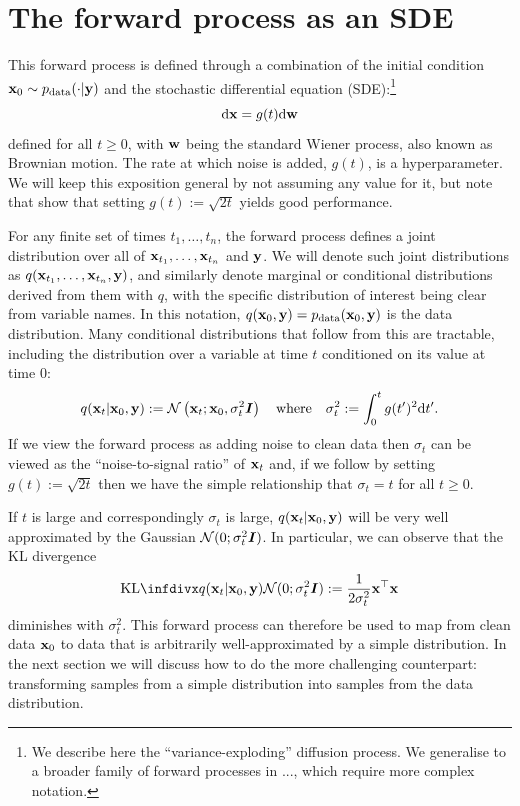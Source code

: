 \section{The forward process as an SDE} \label{sec:diffusion-forward-sde}
This forward process is defined through a combination of the initial condition ${\mathbf{x}}_0 \sim p_{\rm{data}}(\cdot|{\mathbf{y}})$ and the stochastic differential equation (SDE):\footnote{We describe here the ``variance-exploding'' diffusion process. We generalise to a broader family of forward processes in ..., which require more complex notation.}
\begin{equation} \label{eq:forward-diffusion}
    \mathrm{d}{\mathbf{x}} = g(t) \mathrm{d}{\mathbf{w}}
\end{equation}
defined for all $t \geq 0$, with ${\mathbf{w}}$ being the standard Wiener process, also known as Brownian motion. The rate at which noise is added, $g(t)$, is a hyperparameter. We will keep this exposition general by not assuming any value for it, but note that \citet{karras2022elucidating} show that setting $g(t) := \sqrt{2t}$ yields good performance.

For any finite set of times $t_1,\ldots,t_n$, the forward process defines a joint distribution over all of ${\mathbf{x}}_{t_1},\ldots,{\mathbf{x}}_{t_n}$ and ${\mathbf{y}}$. We will denote such joint distributions as $q({\mathbf{x}}_{t_1},\ldots,{\mathbf{x}}_{t_n}, {\mathbf{y}})$, and similarly denote marginal or conditional distributions derived from them with $q$, with the specific distribution of interest being clear from variable names. In this notation, $q({\mathbf{x}}_0,{\mathbf{y}}) = p_{\rm{data}}({\mathbf{x}}_0,{\mathbf{y}})$ is the data distribution. Many conditional distributions that follow from this are tractable, including the distribution over a variable at time $t$ conditioned on its value at time $0$:
\begin{equation}
    q({\mathbf{x}}_t|{\mathbf{x}}_0,{\mathbf{y}}) := {\mathcal{N}} \left( {\mathbf{x}}_t; {\mathbf{x}}_0, \sigma_t^2 {\bm{I}} \right) \quad \text{where} \quad \sigma_t^2 := \int_0^t g(t')^2 \mathrm{d}t'.
\end{equation}
If we view the forward process as adding noise to clean data then $\sigma_t$ can be viewed as the ``noise-to-signal ratio'' of ${\mathbf{x}}_t$ and, if we follow \citet{karras2022elucidating} by setting $g(t) := \sqrt{2t}$ then we have the simple relationship that $\sigma_t = t$ for all $t\geq0$.

If $t$ is large and correspondingly $\sigma_t$ is large, $q({\mathbf{x}}_t|{\mathbf{x}}_0,{\mathbf{y}})$ will be very well approximated by the Gaussian ${\mathcal{N}}(0; \sigma_t^2{\bm{I}})$. In particular, we can observe that the KL divergence
\begin{equation}
    \kl{q(\rvx_t|\rvx_0,\rvy)}{\gN(0; \sigma_t^2\mI)} :=\frac{1}{2\sigma_t^2} \rvx^\top \rvx
\end{equation}
diminishes with $\sigma_t^2$. This forward process can therefore be used to map from clean data ${\mathbf{x}}_0$ to data that is arbitrarily well-approximated by a simple distribution. In the next section we will discuss how to do the more challenging counterpart: transforming samples from a simple distribution into samples from the data distribution.

